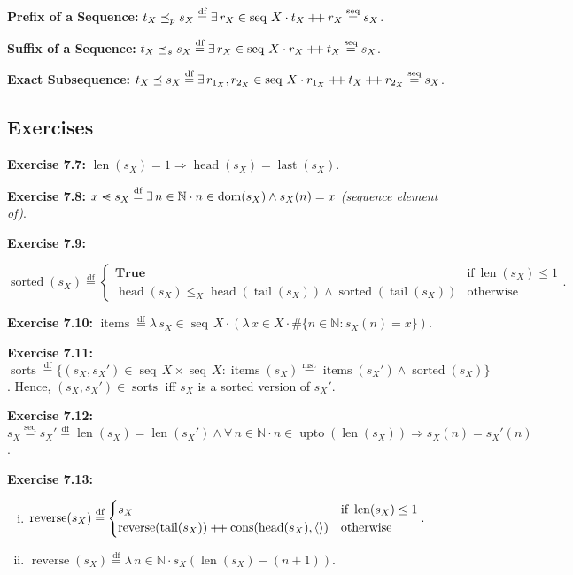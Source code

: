\documentclass[12pt]{article}
\newcommand{\dfeq}{\stackrel{\text{df}}{=}}
\newcommand{\msteq}{\stackrel{\text{mst}}{=}}
\newcommand{\seqeq}{\stackrel{\text{seq}}{=}}
\newcommand{\seqin}{%
  \mathrel{\vphantom{<}\text{%
    \mathsurround=0pt
    \ooalign{$<$\cr$-$\cr}%
  }}%
}
\newcommand{\pp}{\mathbin{\mbox{{+}\nolinebreak\hspace{-.15em}{+}}}}
\DeclareMathOperator{\jtrue}{\mathbf{True}}
\DeclareMathOperator{\jseq}{seq}
\DeclareMathOperator{\jreverse}{reverse}
\DeclareMathOperator{\jdom}{dom}
\DeclareMathOperator{\jitems}{items}
\DeclareMathOperator{\jsorted}{sorted}
\DeclareMathOperator{\jupto}{upto}
\DeclareMathOperator{\jcons}{cons}
\DeclareMathOperator{\jhead}{head}
\DeclareMathOperator{\jlast}{last}
\DeclareMathOperator{\jtail}{tail}
\DeclareMathOperator{\jlen}{len}
\theoremstyle{plain}
\begin{document}
\textbf{Prefix of a Sequence:} $t_X \preceq_{p} s_X \dfeq \exists\,
r_X \in \jseq\, X \cdot t_X \pp r_X \seqeq s_X$.

\textbf{Suffix of a Sequence:} $t_X \preceq_{s} s_X \dfeq \exists\,
r_X \in \jseq\, X \cdot r_X \pp t_X \seqeq s_X$.

\textbf{Exact Subsequence:} $t_X \preceq s_X \dfeq \exists\,
r_{1_X}, r_{2_X} \in \jseq\, X \cdot r_{1_X} \pp t_X \pp r_{2_X}
\seqeq s_X$.

\subsection{Exercises}

\textbf{Exercise 7.7:} $\jlen(s_X) = 1 \Rightarrow \jhead(s_X) =
\jlast(s_X)$.

\textbf{Exercise 7.8:} $x \seqin s_X \dfeq \exists\, n \in
\mathbb{N} \cdot n \in \jdom(s_X) \land s_X(n) = x$
\textit{(sequence element of)}.

\textbf{Exercise 7.9:}

$$
\jsorted(s_X) \dfeq
\begin{cases}
    \jtrue & \text{if}\ \jlen(s_X) \leq  1\\
    \jhead(s_X) \leq_{X} \jhead(\jtail(s_X)) \land
    \jsorted(\jtail(s_X)) & \text{otherwise}
\end{cases}.
$$

\textbf{Exercise 7.10:} $\jitems \dfeq \lambda\, s_X \in \jseq\,
X \cdot (\lambda\, x \in X \cdot \#\{n \in \mathbb{N} : s_X(n) =
x\})$.

\textbf{Exercise 7.11:} $\operatorname{sorts} \dfeq \{(s_X,
s_X') \in \jseq\, X \times \jseq\, X : \jitems(s_X) \msteq
\jitems(s_X') \land \jsorted(s_X) \}$. Hence, $(s_X, s_X') \in
\operatorname{sorts}$ iff $s_X$ is a sorted version of $s_X'$.

\textbf{Exercise 7.12:} $s_X \seqeq s_X' \dfeq \jlen(s_X) =
\jlen(s_X') \land \forall\, n \in \mathbb{N} \cdot n \in
\jupto(\jlen(s_X)) \Rightarrow s_X(n) = s_X'(n)$. 

\textbf{Exercise 7.13:}

\begin{enumerate}[(i)]
    \item $\jreverse(s_X) \dfeq
        \begin{cases} s_X & \text{if}\
            \jlen(s_X) \leq 1\\ \jreverse(\jtail(s_X)) \pp
            \jcons(\jhead(s_X), \langle \rangle) & \text{otherwise}
        \end{cases}.$
    \item $\jreverse(s_X) \dfeq \lambda\, n \in \mathbb{N} \cdot
        s_X(\jlen(s_X) - (n + 1))$.
\end{enumerate}
\end{document}
